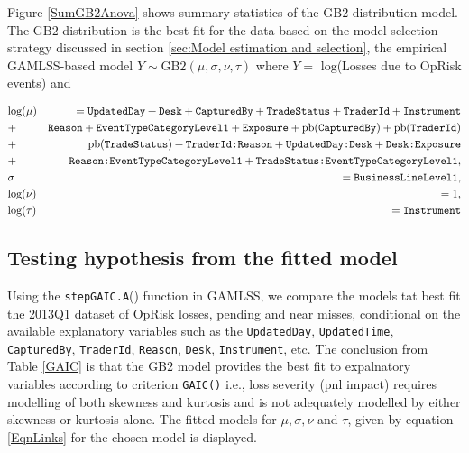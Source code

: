 \documentclass{DissertateUSU}
\begin{document}
Figure \ref{SumGB2Anova} shows summary statistics of the \(\mbox{GB}2\)
distribution model. The \(\mbox{GB}2\) distribution is the best fit for
the data based on the model selection strategy discussed in section
\ref{sec:Model estimation and selection}, the empirical GAMLSS-based
model \(Y \sim \mbox{GB}2(\mu,\sigma,\nu,\tau)\) where \(Y=\) log(Losses
due to OpRisk events) and

\small
\singlespacing

\begin{eqnarray}
&\mbox{log}(\mu)& = \mbox{\texttt{UpdatedDay}} + \mbox{\texttt{Desk}} + \mbox{\texttt{CapturedBy}} +  \mbox{\texttt{TradeStatus}} + \mbox{\texttt{TraderId}} + \mbox{\texttt{Instrument}}\nonumber\\
&+& \mbox{\texttt{Reason}} + \mbox{\texttt{EventTypeCategoryLevel1}} + \mbox{\texttt{Exposure}} + \mbox{pb}(\mbox{\texttt{CapturedBy}}) + \mbox{pb}(\mbox{\texttt{TraderId}})\nonumber\\
&+& \mbox{pb}(\mbox{\texttt{TradeStatus}}) + \mbox{\texttt{TraderId:Reason}} +  \mbox{\texttt{UpdatedDay:Desk}} + \mbox{\texttt{Desk:Exposure}}\nonumber\\
&+& \mbox{\texttt{Reason:EventTypeCategoryLevel1}} + \mbox{\texttt{TradeStatus:EventTypeCategoryLevel1}},\nonumber\\
&\sigma& = \mbox{\texttt{BusinessLineLevel1}},\nonumber\\
&\mbox{log}(\nu)& = 1,\nonumber\\
&\mbox{log}(\tau)& = \mbox{\texttt{Instrument}}
\end{eqnarray} \doublespacing \normalsize

\subsection{Testing hypothesis from the fitted model}

Using the \texttt{stepGAIC.A}() function in GAMLSS, we compare the
models tat best fit the 2013Q1 dataset of OpRisk losses, pending and
near misses, conditional on the available explanatory variables such as
the \texttt{UpdatedDay}, \texttt{UpdatedTime}, \texttt{CapturedBy},
\texttt{TraderId}, \texttt{Reason}, \texttt{Desk}, \texttt{Instrument},
etc. The conclusion from Table \ref{GAIC} is that the \(\mbox{GB}2\)
model provides the best fit to expalnatory variables according to
criterion \texttt{GAIC()} i.e., loss severity (pnl impact) requires
modelling of both skewness and kurtosis and is not adequately modelled
by either skewness or kurtosis alone. The fitted models for
\(\mu,\sigma,\nu\) and \(\tau\), given by equation \ref{EqnLinks} for
the chosen model is displayed.
\end{document}

